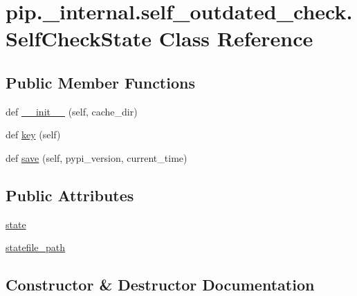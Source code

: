 \hypertarget{classpip_1_1__internal_1_1self__outdated__check_1_1SelfCheckState}{}\section{pip.\+\_\+internal.\+self\+\_\+outdated\+\_\+check.\+Self\+Check\+State Class Reference}
\label{classpip_1_1__internal_1_1self__outdated__check_1_1SelfCheckState}
\subsection*{Public Member Functions}
\begin{DoxyCompactItemize}
\item 
def \hyperlink{classpip_1_1__internal_1_1self__outdated__check_1_1SelfCheckState_a6a77845dd6f6503bdebbed473cf3adb9}{\+\_\+\+\_\+init\+\_\+\+\_\+} (self, cache\+\_\+dir)
\item 
def \hyperlink{classpip_1_1__internal_1_1self__outdated__check_1_1SelfCheckState_a9c6e2f4171e75d1428caa910bbf361bb}{key} (self)
\item 
def \hyperlink{classpip_1_1__internal_1_1self__outdated__check_1_1SelfCheckState_afaf20d4a460f116cdbe9c81139e71f39}{save} (self, pypi\+\_\+version, current\+\_\+time)
\end{DoxyCompactItemize}
\subsection*{Public Attributes}
\begin{DoxyCompactItemize}
\item 
\hyperlink{classpip_1_1__internal_1_1self__outdated__check_1_1SelfCheckState_af1a1aacac1fd8c53863a7a0bc7966cbc}{state}
\item 
\hyperlink{classpip_1_1__internal_1_1self__outdated__check_1_1SelfCheckState_ac4da49c0f5e1256ca7b4d4547846f73b}{statefile\+\_\+path}
\end{DoxyCompactItemize}


\subsection{Constructor \& Destructor Documentation}
\mbox{\label{classpip_1_1__internal_1_1self__outdated__check_1_1SelfCheckState_a6a77845dd6f6503bdebbed473cf3adb9}} 
